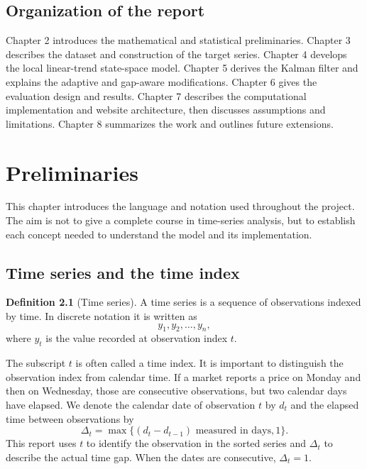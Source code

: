 \documentclass[12pt,a4paper,oneside]{report}
\numberwithin{equation}{chapter}
\numberwithin{figure}{chapter}
\numberwithin{table}{chapter}
\theoremstyle{definition}
\newtheorem{definition}{Definition}[chapter]
\theoremstyle{plain}
\newcommand{\1}{\mathbf{1}}
\begin{document}
\section{Organization of the report}
Chapter 2 introduces the mathematical and statistical preliminaries. Chapter 3 describes the dataset and construction of the target series. Chapter 4 develops the local linear-trend state-space model. Chapter 5 derives the Kalman filter and explains the adaptive and gap-aware modifications. Chapter 6 gives the evaluation design and results. Chapter 7 describes the computational implementation and website architecture, then discusses assumptions and limitations. Chapter 8 summarizes the work and outlines future extensions.

\chapter{Preliminaries}
This chapter introduces the language and notation used throughout the project. The aim is not to give a complete course in time-series analysis, but to establish each concept needed to understand the model and its implementation.

\section{Time series and the time index}
\begin{definition}[Time series]
A time series is a sequence of observations indexed by time. In discrete notation it is written as
\[
  y_1,y_2,\ldots,y_n,
\]
where $y_t$ is the value recorded at observation index $t$.
\end{definition}

The subscript $t$ is often called a time index. It is important to distinguish the observation index from calendar time. If a market reports a price on Monday and then on Wednesday, those are consecutive observations, but two calendar days have elapsed. We denote the calendar date of observation $t$ by $d_t$ and the elapsed time between observations by
\[
  \Delta_t = \max\{(d_t-d_{t-1})\text{ measured in days},1\}.
\]
This report uses $t$ to identify the observation in the sorted series and $\Delta_t$ to describe the actual time gap. When the dates are consecutive, $\Delta_t=1$.
\end{document}
